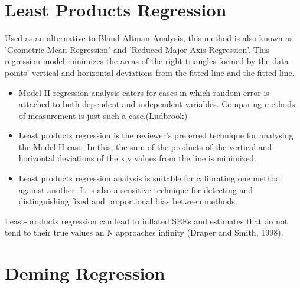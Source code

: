 \documentclass[12pt, a4paper]{report}
\theoremstyle{plain}
\theoremstyle{definition}
\theoremstyle{remark}
\begin{document}
\section{Least Products Regression}
Used as an alternative to Bland-Altman Analysis, this method is also known as 'Geometric Mean Regression' and 'Reduced Major Axis Regression'. This regression model minimizes the areas of the right triangles formed by the data points' vertical and horizontal deviations from the fitted line and the fitted line.

\begin{itemize}
	\item Model II regression analysis caters for cases in which random error is attached to both dependent and independent variables. Comparing methods of measurement is just such a case.(Ludbrook)
	
	\item Least products regression is the reviewer's preferred technique for analysing the Model II case. In this, the sum of the products of the vertical and horizontal deviations of the x,y values from the line is minimized.
	
	\item Least products regression analysis is suitable for calibrating one method against another. It is also a sensitive technique for detecting and distinguishing fixed and proportional bias between
	methods.
\end{itemize}

Least-products regression can lead to inflated SEEs and estimates that do not tend to their true values an N approaches infinity (Draper and Smith, 1998).






\section{Deming Regression}
\end{document}
